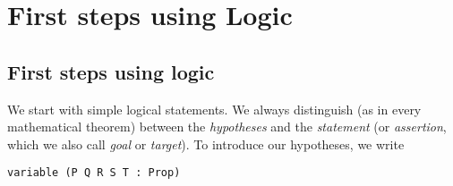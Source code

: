 \documentclass{memoir}
\begin{document}
\chapter{First steps using Logic}



\section{First steps using logic}

We start with simple logical statements. We always distinguish (as in every mathematical theorem) between the \emph{hypotheses} and the \emph{statement} (or \emph{assertion}, which we also call \emph{goal} or \emph{target}). To introduce our hypotheses, we write

\begin{verbatim}
variable (P Q R S T : Prop)

\end{verbatim}
\end{document}
